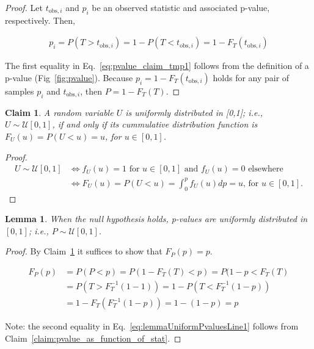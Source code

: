 \documentclass{article}
\newtheorem{claim}{Claim}
\newtheorem{lemma}{Lemma}
\begin{document}
\begin{appendices}
\begin{proof}
    Let $t_{\text{obs},i}$ and $p_i$ be an observed statistic and associated
    p-value, respectively. Then,

    \begin{align}
        p_i=P(T>t_{\text{obs},i})=1-P(T<t_{\text{obs},i})=1-F_T(t_{\text{obs},i})\label{eq:pvalue_claim_tmp1}
    \end{align}

    The first equality in Eq.~\ref{eq:pvalue_claim_tmp1} follows from the
    definition of a p-value (Fig~\ref{fig:pvalue}). Because
    $p_i=1-F_T(t_{\text{obs},i})$ holds for any pair of samples $p_i$
    and $t_{\text{obs},i}$, then $P=1-F_T(T)$.
\end{proof}

\begin{claim}

    A random variable $U$ is uniformly distributed in [0,1]; i.e.,
    $U\sim\mathcal{U}[0,1]$, if and only if its cummulative distribution
    function is $F_U(u)=P(U<u)=u$, for $u\in[0,1]$.
    \label{claim:uniform_cummulative}

\end{claim}

\begin{proof}

    \begin{align}
        U\sim\mathcal{U}[0,1] &\iff f_U(u)=1 \text{ for } u\in[0,1] \text{ and } f_U(u)=0 \text{ elsewhere } \\
                              &\iff F_U(u)=P(U<u)=\int_0^pf_U(u)dp=u\text{, for }u\in[0,1].
    \end{align}

\end{proof}

\begin{lemma}

    When the null hypothesis holds, p-values are uniformly distributed in
    $[0,1]$; i.e., $P\sim\mathcal{U}[0,1]$.
    \label{lemma:p_values_uniform01}
\end{lemma}

\begin{proof}
    By Claim~\ref{claim:uniform_cummulative} it suffices to show that $F_P(p)=p$.

    \begin{align}
        F_P(p)&=P(P<p)=P(1-F_T(T)<p)=P(1-p<F_T(T)\label{eq:lemmaUniformPvaluesLine1}\\
              &=P(T>F_T^{-1}(1-1))=1-P(T<F_T^{-1}(1-p))\nonumber\\
              &=1-F_T(F_T^{-1}(1-p))=1-(1-p)=p\nonumber
    \end{align}

Note: the second equality in Eq.~\ref{eq:lemmaUniformPvaluesLine1} follows
from Claim~\ref{claim:pvalue_as_function_of_stat}.

\end{proof}

\end{appendices}
\end{document}
